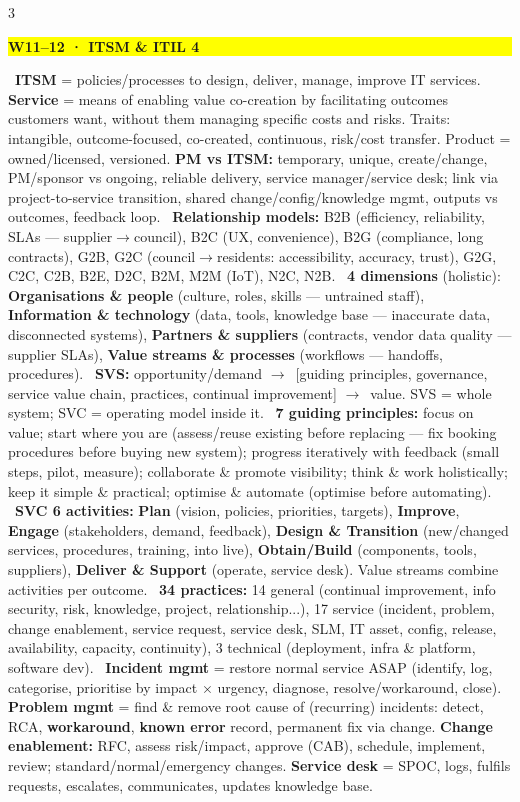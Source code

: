 \documentclass[a4paper,landscape]{article}
\newcommand{\hlhighlight}[1]{\begingroup\setlength{\fboxsep}{0pt}\colorbox{yellow}{\strut\textbf{#1}}\endgroup}
\newcommand{\concept}[1]{\textbf{#1}}
\newcommand{\lbl}[1]{\textbf{#1}}
\newcommand{\kh}[1]{{\setlength{\fboxsep}{0.5pt}\colorbox{keyhlcolor}{#1}}}
\newcommand{\ra}{$\rightarrow$}
\begin{document}
\begin{multicols}{3}
\par\smallskip\noindent\hlhighlight{W11--12 · ITSM \& ITIL 4}\ \concept{ITSM} = policies/processes to design, deliver, manage, improve IT services. \concept{Service} = \kh{means of enabling value co-creation} by facilitating outcomes customers want, \kh{without them managing specific costs and risks}. Traits: intangible, outcome-focused, co-created, continuous, risk/cost transfer. Product = owned/licensed, versioned. \lbl{PM vs ITSM:} temporary, unique, create/change, PM/sponsor vs ongoing, reliable delivery, service manager/service desk; link via project-to-service transition, shared change/config/knowledge mgmt, outputs vs outcomes, feedback loop. \textbullet\ \concept{Relationship models:} B2B (efficiency, reliability, SLAs --- supplier\ra council), B2C (UX, convenience), B2G (compliance, long contracts), G2B, \kh{G2C} (council\ra residents: accessibility, accuracy, trust), G2G, C2C, C2B, B2E, D2C, B2M, M2M (IoT), N2C, N2B. \textbullet\ \concept{4 dimensions} (holistic): \lbl{Organisations \& people} (culture, roles, skills --- untrained staff), \lbl{Information \& technology} (data, tools, knowledge base --- inaccurate data, disconnected systems), \lbl{Partners \& suppliers} (contracts, vendor data quality --- supplier SLAs), \lbl{Value streams \& processes} (workflows --- handoffs, procedures). \textbullet\ \concept{SVS:} opportunity/demand \ra\ [guiding principles, governance, service value chain, practices, continual improvement] \ra\ value. \kh{SVS = whole system;} \kh{SVC = operating model inside it.} \textbullet\ \concept{7 guiding principles:} focus on value; \kh{start where you are} (assess/reuse existing before replacing --- fix booking procedures before buying new system); \kh{progress iteratively with feedback} (small steps, pilot, measure); collaborate \& promote visibility; think \& work holistically; keep it simple \& practical; optimise \& automate (optimise before automating). \textbullet\ \concept{SVC 6 activities:} \lbl{Plan} (vision, policies, priorities, targets), \lbl{Improve}, \lbl{Engage} (stakeholders, demand, feedback), \lbl{Design \& Transition} (new/changed services, procedures, training, into live), \lbl{Obtain/Build} (components, tools, suppliers), \lbl{Deliver \& Support} (operate, service desk). Value streams combine activities per outcome. \textbullet\ \concept{34 practices:} 14 general (continual improvement, info security, risk, knowledge, project, relationship...), 17 service (incident, problem, change enablement, service request, service desk, SLM, IT asset, config, release, availability, capacity, continuity), 3 technical (deployment, infra \& platform, software dev). \textbullet\ \concept{Incident mgmt} = \kh{restore normal service ASAP} (identify, log, categorise, prioritise by impact $\times$ urgency, diagnose, resolve/workaround, close). \concept{Problem mgmt} = \kh{find \& remove root cause} of (recurring) incidents: detect, RCA, \lbl{workaround}, \lbl{known error} record, permanent fix via change. \concept{Change enablement:} RFC, assess risk/impact, approve (CAB), schedule, implement, review; standard/normal/emergency changes. \concept{Service desk} = SPOC, logs, fulfils requests, escalates, communicates, updates knowledge base. 
\end{multicols}
\end{document}
